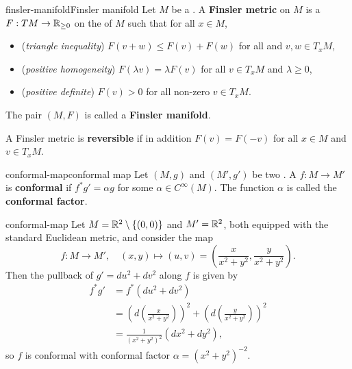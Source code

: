 \begin{topic}{finsler-manifold}{Finsler manifold}
    Let $M$ be a . A \textbf{Finsler metric} on $M$ is a  $F : TM \to \mathbb{R}_{\ge 0}$ on the  of $M$ such that for all $x \in M$,
    \begin{itemize}
        \item (\textit{triangle inequality}) $F(v + w) \le F(v) + F(w)$ for all and $v, w \in T_x M$,
        \item (\textit{positive homogeneity}) $F(\lambda v) = \lambda F(v)$ for all $v \in T_x M$ and $\lambda \ge 0$,
        \item (\textit{positive definite}) $F(v) > 0$ for all non-zero $v \in T_x M$.
    \end{itemize}
    The pair $(M, F)$ is called a \textbf{Finsler manifold}.
    
    A Finsler metric is \textbf{reversible} if in addition $F(v) = F(-v)$ for all $x \in M$ and $v \in T_x M$.
\end{topic}

\begin{topic}{conformal-map}{conformal map}
    Let $(M, g)$ and $(M', g')$ be two . A  $f : M \to M'$ is \textbf{conformal} if $f^* g' = \alpha g$ for some $\alpha \in C^\infty(M)$. The function $\alpha$ is called the \textbf{conformal factor}.
\end{topic}

\begin{example}{conformal-map}
    Let $M = \mathbb{R}^2 \setminus \{ (0, 0) \}$ and $M' = \mathbb{R}^2$, both equipped with the standard Euclidean metric, and consider the map
    \[ f : M \to M', \quad (x, y) \mapsto (u, v) = \left(\frac{x}{x^2 + y^2}, \frac{y}{x^2 + y^2} \right) . \]
    Then the pullback of $g' = du^2 + dv^2$ along $f$ is given by
    \[ \begin{aligned}
        f^* g'
            &= f^* (du^2 + dv^2) \\
            &= \left(d \left(\frac{x}{x^2 + y^2} \right)\right)^2 + \left(d \left( \frac{y}{x^2 + y^2} \right)\right)^2 \\
            &= \frac{1}{(x^2 + y^2)^2} (dx^2 + dy^2) ,
    \end{aligned} \]
    so $f$ is conformal with conformal factor $\alpha = (x^2 + y^2)^{-2}$.
\end{example}

